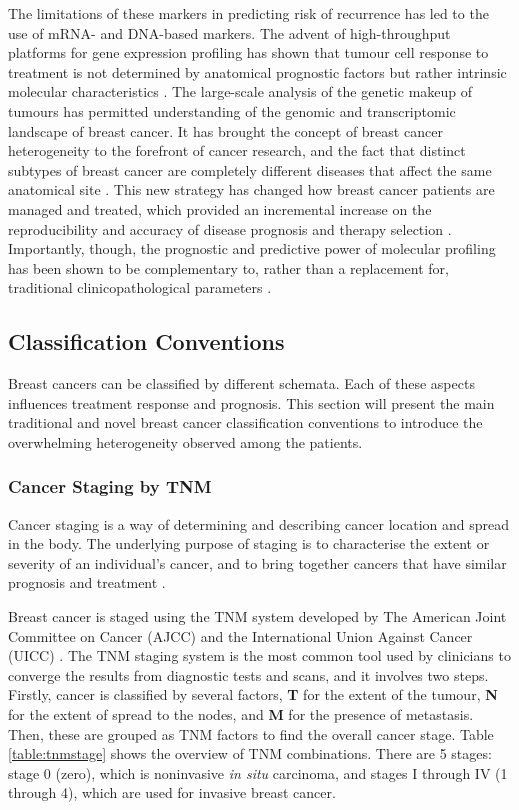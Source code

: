     The limitations of these markers in predicting risk of recurrence has led to the use of mRNA- and DNA-based markers. The advent of high-throughput platforms for gene expression profiling has shown that tumour cell response to treatment is not determined by anatomical prognostic factors but rather intrinsic molecular characteristics \cite{Iwamoto2010PredictingData}. The large-scale analysis of the genetic makeup of tumours has permitted understanding of the genomic and transcriptomic landscape of breast cancer. It has brought the concept of breast cancer heterogeneity to the forefront of cancer research, and the fact that distinct subtypes of breast cancer are completely different diseases that affect the same anatomical site \cite{weigelt2010}. This new strategy has changed how breast cancer patients are managed and treated, which provided an incremental increase on the reproducibility and accuracy of disease prognosis and therapy selection \cite{pusztai2008}. Importantly, though, the prognostic and predictive power of molecular profiling has been shown to be complementary to, rather than a replacement for, traditional clinicopathological parameters \cite{weigelt2010}.

   
    \subsection{Classification Conventions}
    
    Breast cancers can be classified by different schemata. Each of these aspects influences treatment response and prognosis.  This section will present the main traditional and novel breast cancer classification conventions to introduce the overwhelming heterogeneity observed among the patients. 

    \subsubsection{Cancer Staging by TNM}
    
    Cancer staging is a way of determining and describing cancer location and spread in the body. The underlying purpose of staging is to characterise the extent or severity of an individual’s cancer, and to bring together cancers that have similar prognosis and treatment \cite{2017AJCCStaging}. 

    Breast cancer is staged using the TNM system developed by The American Joint Committee on Cancer (AJCC) and the International Union Against Cancer (UICC) \cite{Giuliano2017}. The TNM staging system is the most common tool used by clinicians to converge the results from diagnostic tests and scans, and it involves two steps. Firstly, cancer is classified by several factors, \textbf{T} for the extent of the tumour, \textbf{N} for the extent of spread to the nodes, and \textbf{M} for the presence of metastasis. Then, these are grouped as TNM factors to find the overall cancer stage. Table \ref{table:tnmstage} shows the overview of TNM combinations. There are 5 stages: stage 0 (zero), which is noninvasive \textit{in situ} carcinoma, and stages I through IV (1 through 4), which are used for invasive breast cancer.



